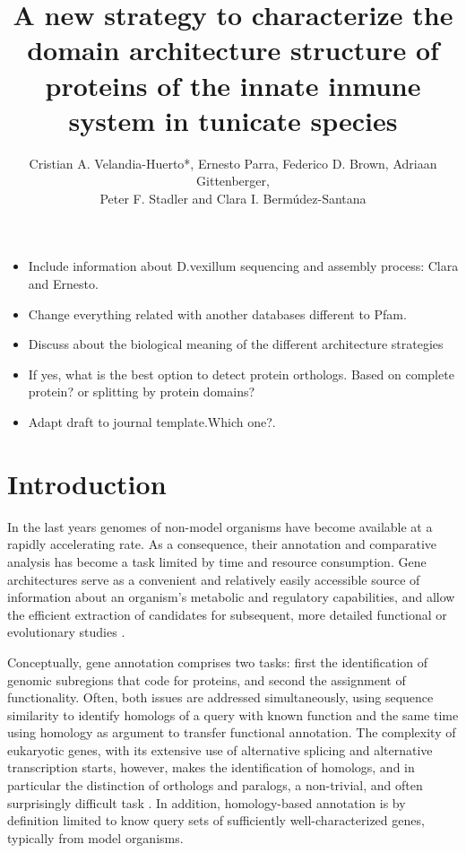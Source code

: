 \documentclass[11pt]{article}
\newcommand{\TODO}[1]{\begingroup\color{red}#1\endgroup}
\newcommand{\PFS}[1]{\begingroup\color{blue}#1\endgroup}
\begin{document}
\title{A new strategy to characterize the domain architecture structure of 
proteins of the innate inmune system in tunicate species}
\author{Cristian A. Velandia-Huerto*, Ernesto Parra, Federico D. 
Brown, Adriaan Gittenberger, \\ Peter F. Stadler and Clara I. 
Berm\'{u}dez-Santana}


\maketitle

\begin{itemize}
\item \TODO{Include information about D.vexillum sequencing and assembly 
process: Clara and Ernesto.}
\item \TODO{Change everything related with another databases different to Pfam}. 
\item \TODO{Discuss about the biological meaning of the different architecture 
strategies}
\item \TODO{If yes, what is the best option to detect protein orthologs. Based 
on complete protein? or splitting  by protein domains?}
\item Adapt draft to journal template.\TODO{Which one?}. 
\end{itemize}

\section*{Introduction}

\PFS{In the last years genomes of non-model organisms have become available
  at a rapidly accelerating rate. As a consequence, their annotation and
  comparative analysis has become a task limited by time and resource
  consumption. Gene architectures serve as a convenient and relatively
  easily accessible source of information about an organism's metabolic and
  regulatory capabilities, and allow the efficient extraction of candidates
  for subsequent, more detailed functional or evolutionary studies
  \cite{aken2016ensembl,birney2004overview,ashburner2000gene,tatusov2000cog,tatusova2016ncbi}.}
  
  \PFS{Conceptually, gene annotation comprises two tasks: first the
  identification of genomic subregions that code for proteins, and second
  the assignment of functionality. Often, both issues are addressed
  simultaneously, using sequence similarity to identify homologs of a query
  with known function and the same time using homology as argument to
  transfer functional annotation. The complexity of eukaryotic genes, with
  its extensive use of alternative splicing and alternative transcription
  starts, however, makes the identification of homologs, and in particular
  the distinction of orthologs and paralogs, a non-trivial, and often
  surprisingly difficult task \cite{yandell2012}. In addition,
  homology-based annotation is by definition limited to know query sets of
  sufficiently well-characterized genes, typically from model organisms.}
\end{document}
